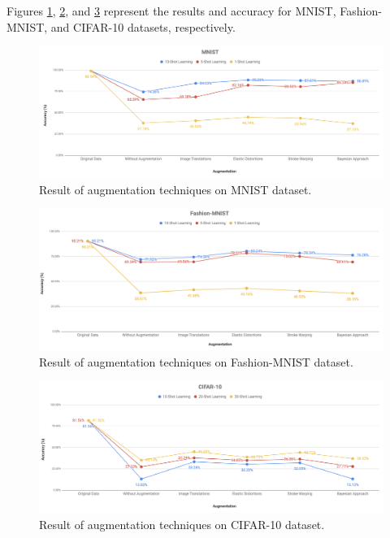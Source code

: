 Figures \ref{fig:MNIST_result}, \ref{fig:Fashion_MNIST_result}, and
\ref{fig:CIFAR_10_result} represent the results and accuracy for
MNIST, Fashion-MNIST, and CIFAR-10 datasets, respectively.


\begin{figure}
  \centering
  \label{fig:MNIST_result}
  \includegraphics[width=1\textwidth]{fig/result/mnist-result}
  \caption{Result of augmentation techniques on MNIST dataset.}
\end{figure}


\begin{figure}
  \centering
  \label{fig:Fashion_MNIST_result}
  \includegraphics[width=1\textwidth]{fig/result/fashion-mnist-result}
  \caption{Result of augmentation techniques on Fashion-MNIST dataset.}
\end{figure}


\begin{figure}
  \centering
  \label{fig:CIFAR_10_result}
  \includegraphics[width=1\textwidth]{fig/result/cifar-10-result}
  \caption{Result of augmentation techniques on CIFAR-10 dataset.}
\end{figure}

